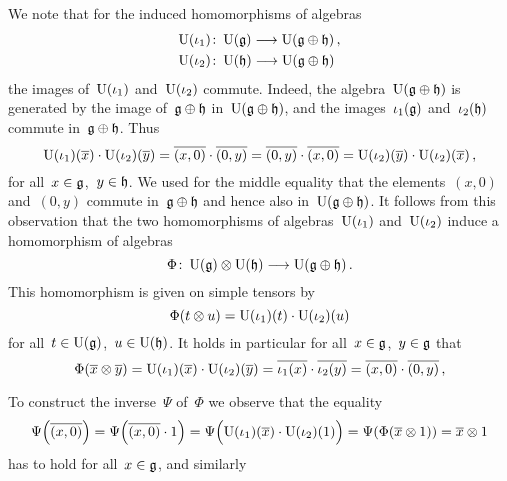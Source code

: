 \begin{example}
\begin{itemize}
      We note that for the induced homomorphisms of algebras
      \begin{align*}
        \Univ(\iota_1) &\colon \Univ(\glie) \to \Univ(\glie \oplus \hlie) \,, \\
        \Univ(\iota_2) &\colon \Univ(\hlie) \to \Univ(\glie \oplus \hlie)
      \end{align*}
      the images of~$\operatorname{U}(\iota_1)$ and~$\operatorname{U}(\iota_2)$ commute.
      Indeed, the algebra~$\operatorname{U}(\mathfrak{g} \oplus \mathfrak{h})$ is generated by the image of~$\mathfrak{g} \oplus \mathfrak{h}$ in~$\operatorname{U}(\mathfrak{g} \oplus \mathfrak{h})$, and the images~$\iota_1(\mathfrak{g})$ and~$\iota_2(\mathfrak{h})$ commute in~$\mathfrak{g} \oplus \mathfrak{h}$.
      Thus
      \[
        \operatorname{U}(\iota_1)( \overline{x} )
        \cdot
        \operatorname{U}(\iota_2)( \overline{y} )
        =
        \overline{(x,0)} \cdot \overline{(0,y)}
        =
        \overline{(0,y)} \cdot \overline{(x,0)}
        =
        \operatorname{U}(\iota_2)( \overline{y} )
        \cdot
        \operatorname{U}(\iota_2)( \overline{x} ) \,,
      \]
      for all~$x \in \mathfrak{g}$,~$y \in \mathfrak{h}$.
      We used for the middle equality that the elements~$(x,0)$ and~$(0,y)$ commute in~$\mathfrak{g} \oplus \mathfrak{h}$ and hence also in~$\operatorname{U}(\mathfrak{g} \oplus \mathfrak{h})$.
      It follows from this observation that the two homomorphisms of algebras~$\operatorname{U}( \iota_1 )$ and~$\operatorname{U}( \iota_2 )$ induce a homomorphism of algebras
      \[
        \Phi
        \colon
        \Univ(\glie) \tensor \Univ(\hlie)
        \to
        \Univ(\glie \oplus \hlie) \,.
      \]
      This homomorphism is given on simple tensors by
      \[
        \Phi(t \otimes u)
        =
        \operatorname{U}(\iota_1)(t) \cdot \operatorname{U}(\iota_2)(u)
      \]
      for all~$t \in \operatorname{U}(\mathfrak{g})$,~$u \in \operatorname{U}(\mathfrak{h})$.
      It holds in particular for all~$x \in \mathfrak{g}$,~$y \in \mathfrak{g}$ that
      \[
        \Phi(\overline{x} \otimes \overline{y})
        =
        \operatorname{U}(\iota_1)( \overline{x} )
        \cdot
        \operatorname{U}(\iota_2)( \overline{y} )
        =
        \overline{ \iota_1(x) }
        \cdot
        \overline{ \iota_2(y) }
        =
        \overline{(x,0)} \cdot \overline{(0,y)}  \,,
      \]

      To construct the inverse~$\Psi$ of~$\Phi$ we observe that the equality
      \[
        \Psi\Bigl( \overline{(x,0)} \Bigr)
        =
        \Psi\Bigl( \overline{(x,0)} \cdot 1 \Bigr)
        =
        \Psi\Bigl( \operatorname{U}(\iota_1)( \overline{x} ) \cdot \operatorname{U}(\iota_2)(1) \Bigr)
        =
        \Psi( \Phi( \overline{x} \otimes 1 ) )
        =
        \overline{x} \otimes 1
      \]
      has to hold for all~$x \in \mathfrak{g}$, and similarly
      

\end{itemize}
\end{example}
